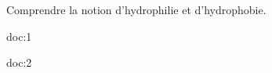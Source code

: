 \tetePremStssBiom



\begin{objectifs}
  \item Comprendre la notion d'hydrophilie et d'hydrophobie.
\end{objectifs}

\begin{contexte}
  
  \problematique{
  }
\end{contexte}


\begin{doc}{}{doc:1}
\end{doc}

\begin{doc}{}{doc:2}
\end{doc}


\question{
}{
}{}

\numeroQuestion



  


